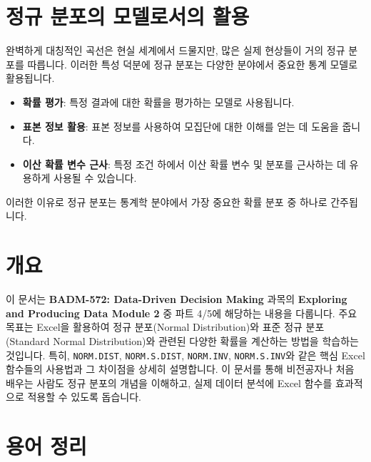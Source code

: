 \documentclass[11pt,a4paper]{book}
\theoremstyle{definition}
\begin{document}
\section{정규 분포의 모델로서의 활용}
완벽하게 대칭적인 곡선은 현실 세계에서 드물지만, 많은 실제 현상들이 거의 정규 분포를 따릅니다. 이러한 특성 덕분에 정규 분포는 다양한 분야에서 중요한 통계 모델로 활용됩니다.

\begin{infobox}[title={정규 분포의 활용}]
\begin{itemize}
    \item \textbf{확률 평가}: 특정 결과에 대한 확률을 평가하는 모델로 사용됩니다.
    \item \textbf{표본 정보 활용}: 표본 정보를 사용하여 모집단에 대한 이해를 얻는 데 도움을 줍니다.
    \item \textbf{이산 확률 변수 근사}: 특정 조건 하에서 이산 확률 변수 및 분포를 근사하는 데 유용하게 사용될 수 있습니다.
\end{itemize}
이러한 이유로 정규 분포는 통계학 분야에서 가장 중요한 확률 분포 중 하나로 간주됩니다.
\end{infobox}


\section{개요}
이 문서는 \textbf{BADM-572: Data-Driven Decision Making} 과목의 \textbf{Exploring and Producing Data Module 2} 중 파트 4/5에 해당하는 내용을 다룹니다.
주요 목표는 Excel을 활용하여 정규 분포(Normal Distribution)와 표준 정규 분포(Standard Normal Distribution)와 관련된 다양한 확률을 계산하는 방법을 학습하는 것입니다.
특히, \texttt{NORM.DIST}, \texttt{NORM.S.DIST}, \texttt{NORM.INV}, \texttt{NORM.S.INV}와 같은 핵심 Excel 함수들의 사용법과 그 차이점을 상세히 설명합니다.
이 문서를 통해 비전공자나 처음 배우는 사람도 정규 분포의 개념을 이해하고, 실제 데이터 분석에 Excel 함수를 효과적으로 적용할 수 있도록 돕습니다.


\section{용어 정리}
\end{document}

